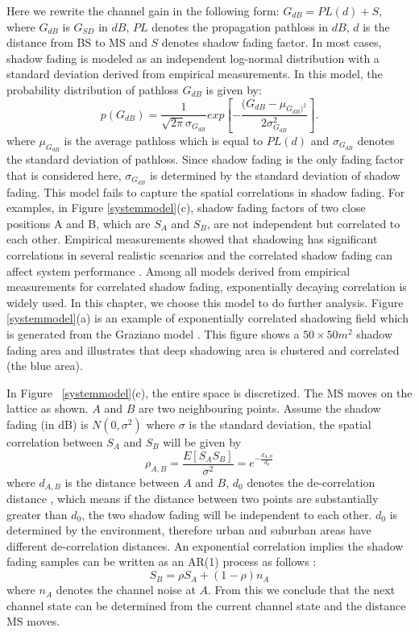 \par Here we rewrite the channel gain in the following form: $G_{dB}=PL(d)+S$, where $G_{dB}$ is $G_{SD}$ in $dB$, $PL$ denotes the propagation pathloss in $dB$, $d$ is the distance from BS to MS and $S$ denotes shadow fading factor. In most cases, shadow fading is modeled as an independent log-normal distribution \cite{goldsmith2005wireless} with a standard deviation derived from empirical measurements. In this model, the probability distribution of pathloss $G_{dB}$ is given by:
\begin{equation}
p(G_{dB})=\frac{1}{\sqrt{2\pi}\sigma_{G_{dB}}}exp[-\frac{(G_{dB}-\mu_{G_{dB})^2}}{2\sigma_{G_{dB}}^2}].
\end{equation}
where $\mu_{G_{dB}}$ is the average pathloss which is equal to $PL(d)$ and $\sigma_{G_{dB}}$ denotes the standard deviation of pathloss. Since shadow fading is the only fading factor that is considered here, $\sigma_{G_{dB}}$ is determined by the standard deviation of shadow fading.
This model fails to capture the spatial correlations in shadow fading. For examples, in Figure \ref{systemmodel}(c), shadow fading factors of two close positions A and B, which are $S_{A}$ and $S_{B}$, are not independent but correlated to each other. Empirical measurements showed that shadowing has significant correlations in several realistic scenarios and the correlated shadow fading can affect system performance \cite{graziano1978propagation}. Among all models derived from empirical measurements for correlated shadow fading, exponentially decaying correlation \cite{gudmundson1991correlation} is widely used. In this chapter, we choose this model to do further analysis. Figure \ref{systemmodel}(a) is an example of exponentially correlated shadowing field which is generated from the Graziano model \cite{graziano1978propagation}. This figure shows a $50\times50 m^{2}$ shadow fading area and illustrates that deep shadowing area is clustered and correlated (the blue area).
\par In Figure ~\ref{systemmodel}(c), the entire space is discretized. The MS moves on the lattice as shown. $A$ and $B$ are two neighbouring points. Assume the shadow fading (in dB) is $N(0,\sigma^{2})$ where $\sigma$ is the standard deviation, the spatial correlation between $S_{A}$ and $S_{B}$ will be given by
\begin{equation}
\rho_{A,B}=\frac{E[S_{A}S_{B}]}{\sigma^{2}}=e^{{-\frac{d_{A,B}}{d_{0}}}}
\end{equation}
where $d_{A,B}$ is the distance between $A$ and $B$, $d_{0}$ denotes the de-correlation distance \cite{bertoni1999radio}, which means if the distance between two points are substantially greater than $d_{0}$, the two shadow fading will be independent to each other. $d_{0}$ is determined by the environment, therefore urban and suburban areas have different de-correlation distances. An exponential correlation implies the shadow fading samples can be written as an AR(1) process as follows \cite{wei1994time}:
\begin{equation}
S_{B} = \rho S_{A} + (1-\rho)n_{A}
\label{e3}
\end{equation}
where $n_{A}$ denotes the channel noise at $A$. From this we conclude that the next channel state can be determined from the current channel state and the distance MS moves.
